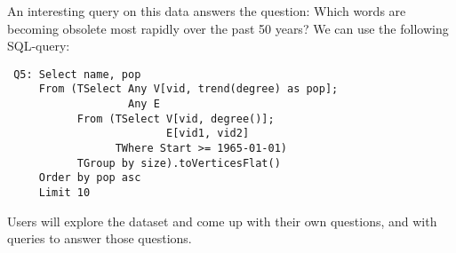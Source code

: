 An interesting query on this data answers the question: Which words
are becoming obsolete most rapidly over the past 50 years?  We can use
the following SQL-\ql query:

\begin{small}
\begin{verbatim}
 Q5: Select name, pop
     From (TSelect Any V[vid, trend(degree) as pop];
                   Any E
           From (TSelect V[vid, degree()]; 
                         E[vid1, vid2]
                 TWhere Start >= 1965-01-01)
           TGroup by size).toVerticesFlat()
     Order by pop asc
     Limit 10
\end{verbatim}
\end{small}

Users will explore the dataset and come up with their own questions,
and with \ql queries to answer those questions.

